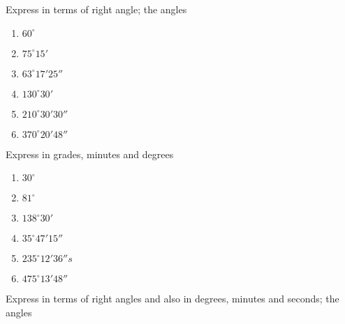 Express in terms of right angle; the angles

\begin{enumerate}[resume]
\item $60^{\circ}$
\item $75^{\circ}15'$
\item $63^{\circ}17'25''$
\item $130^{\circ}30'$
\item $210^{\circ}30'30''$
\item $370^{\circ}20'48''$
\end{enumerate}

Express in grades, minutes and degrees

\begin{enumerate}[resume]
\item $30^{\circ}$
\item $81^{\circ}$
\item $138^{\circ}30'$
\item $35^{\circ}47'15''$
\item $235^{\circ}12'36''s$
\item $475^{\circ}13'48''$
\end{enumerate}

Express in terms of right angles and also in degrees, minutes and seconds; the angles

